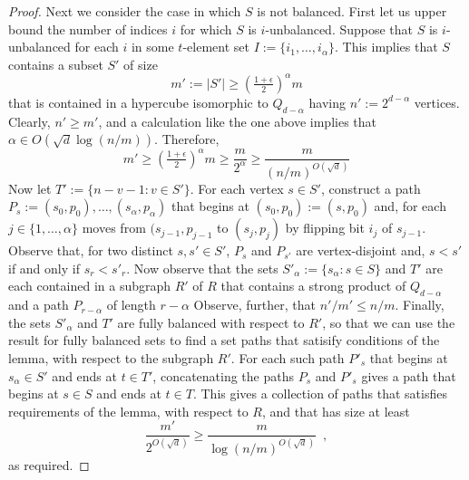 \documentclass{patmorin}
\begin{document}
\begin{proof}
  Next we consider the case in which $S$ is not balanced.  First let us upper bound the number of indices $i$ for which $S$ is $i$-unbalanced.  Suppose that $S$ is $i$-unbalanced for each $i$ in some $t$-element set $I:=\{i_1,\ldots,i_\alpha\}$.  This implies that $S$ contains a subset $S'$ of size
  \[
    m':=|S'|\ge \left(\tfrac{1+\epsilon}{2}\right)^\alpha m
  \]
  that is contained in a hypercube isomorphic to $Q_{d-\alpha}$ having $n':=2^{d-\alpha}$ vertices.  Clearly, $n'\ge m'$, and a calculation like the one above implies that $\alpha\in O(\sqrt{d}\log(n/m))$.  Therefore,
  \[
    m'
      \ge \left(\tfrac{1+\epsilon}{2}\right)^\alpha m
      \ge \frac{m}{2^\alpha} \ge \frac{m}{(n/m)^{O(\sqrt{d})}}
  \]
  Now let $T':=\{n-v-1:v\in S'\}$.  For each vertex $s\in S'$, construct a path $P_s:=(s_0,p_0),\ldots,(s_\alpha,p_\alpha)$ that begins at $(s_0,p_0):=(s,p_0)$ and, for each $j\in\{1,\ldots,\alpha\}$ moves from $(s_{j-1},p_{j-1}$ to $(s_j,p_j)$ by flipping bit $i_j$ of $s_{j-1}$.  Observe that, for two distinct $s,s'\in S'$, $P_s$ and $P_{s'}$ are vertex-disjoint and, $s< s'$ if and only if $s_r < s'_r$.  Now observe that the sets $S'_\alpha:=\{s_\alpha:s\in S\}$ and $T'$ are each contained in a subgraph $R'$ of $R$ that contains a strong product of $Q_{d-\alpha}$ and a path $P_{r-\alpha}$ of length $r-\alpha$  Observe, further, that $n'/m' \le n/m$.  Finally, the sets $S'_\alpha$ and $T'$ are fully balanced with respect to $R'$, so that we can use the result for fully balanced sets to find a set paths that satisify conditions of the lemma, with respect to the subgraph $R'$.  For each such path $P'_s$ that begins at $s_\alpha\in S'$ and ends at $t\in T'$, concatenating the paths $P_s$ and $P'_s$ gives a path that begins at $s\in S$ and ends at $t\in T$.  This gives a collection of paths that satisfies requirements of the lemma, with respect to $R$, and that has size at least
  \[
      \frac{m'}{2^{O(\sqrt{d})}} \ge \frac{m}{\log(n/m)^{O(\sqrt{d})}}
      \enspace ,
  \]
  as required.
\end{proof}







\end{document}
